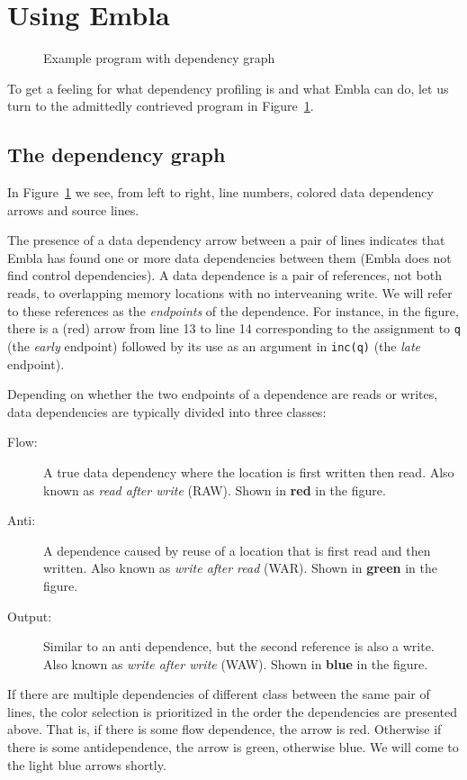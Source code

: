 \section{Using Embla}

\begin{figure} 
\small

\caption{Example program with dependency graph} \label{ffirstex}
\end{figure}

To get a feeling for what dependency profiling is and what Embla can do, 
let us turn to the admittedly contrieved program in Figure~\ref{ffirstex}. 

\subsection{The dependency graph}

In Figure~\ref{ffirstex} we see, from 
left to right, line numbers, colored data dependency arrows and source 
lines. 

The presence of a data dependency arrow between a pair of lines indicates
that Embla has found one or more data dependencies between them
(Embla does not find control dependencies). A data dependence is a pair
of references, not both reads, to overlapping memory
locations with no interveaning write. We will refer to these
references as the {\em endpoints} of the dependence.
For instance, in the figure, 
there is a (red) arrow from line 13 to line 14 corresponding to
the assignment to {\tt q} (the {\em early} endpoint) followed by its use 
as an argument in {\tt inc(q)} (the {\em late} endpoint).

Depending on whether the two endpoints of a dependence
are reads or writes, data dependencies are typically divided into 
three classes:
\begin{description}
\item[Flow:]
A true data dependency where the location is first written then
read. Also known as {\em read after write} (RAW). Shown in 
{\bf \color{red} red} in the figure.
\item[Anti:]
A dependence caused by reuse of a location that is first read and then
written. Also known as {\em write after read} (WAR). Shown in 
{\bf \color{green} green} in the figure.
\item[Output:]
Similar to an anti dependence, but the second reference is also a
write. Also known as {\em write after write} (WAW). Shown in 
{\bf \color{blue} blue} in the figure.
\end{description}
If there are multiple dependencies of different class between the 
same pair of lines, the color selection is prioritized in the
order the dependencies are presented above. That is, if there is
some flow dependence, the arrow is red. Otherwise if there is 
some antidependence, the arrow is green, otherwise blue. We will 
come to the light blue arrows shortly.


